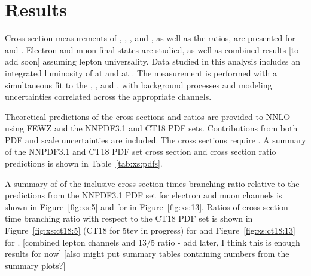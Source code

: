 \chapter{Results}\label{ch:results}
Cross section measurements of \Wp, \Wm, \W, and \Z, as well as the ratios, are presented for \serag and \serah. Electron and muon final states are studied, as well as combined results [to add soon] assuming lepton universality. Data studied in this analysis includes an integrated luminosity of \lumig at \serag and \lumih at \serah. The measurement is performed with a simultaneous fit to the \Wp, \Wm, and \Z, with background processes and modeling uncertainties correlated across the appropriate channels. 

Theoretical predictions of the cross sections and ratios are provided to NNLO using FEWZ and the NNPDF3.1 and CT18 PDF sets. Contributions from both PDF and scale uncertainties are included. The \Z cross sections require \masswindow. A summary of the NNPDF3.1 and CT18 PDF set cross section and cross section ratio predictions is shown in Table~\ref{tab:xs:pdfs}.



A summary of of the inclusive cross section times branching ratio relative to the predictions from the NNPDF3.1 PDF set for \serag electron and muon channels is shown in Figure~\ref{fig:xs:5} and for \serah in Figure~\ref{fig:xs:13}. Ratios of cross section time branching ratio with respect to the CT18 PDF set is shown in Figure~\ref{fig:xs:ct18:5} (CT18 for 5tev in progress) for \serag and Figure~\ref{fig:xs:ct18:13} for \serah.
[combined lepton channels and 13/5 ratio - add later, I think this is enough results for now]
[also might put summary tables containing numbers from the summary plots?]

% 
% 






